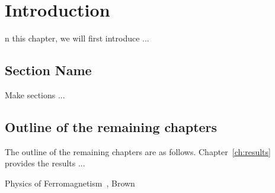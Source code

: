 \chapter{Introduction}
\label{ch:introduction}

n this chapter, we will first introduce ...

\section{Section Name}
Make sections ...


\section{\label{sec:outline}Outline of the remaining chapters}

The outline of the remaining chapters are as follows. Chapter~\ref{ch:results} provides the results ... 

Physics of Ferromagnetism~\cite{chika97}, Brown~\cite{brown68}